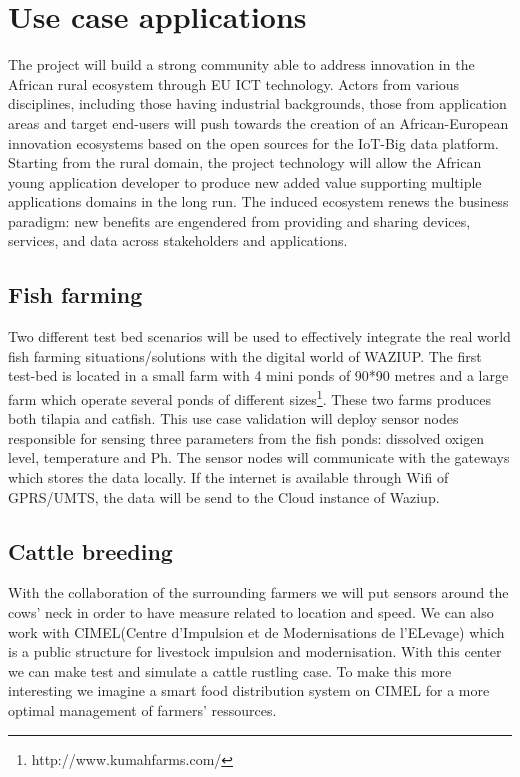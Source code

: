 
\section{Use case applications}
\label{sec:usecases}

The project will build a strong community able to address innovation in the African rural ecosystem through EU ICT technology.
Actors from various disciplines, including those having industrial backgrounds, those from application areas and target end-users will push towards the creation of an African-European innovation ecosystems based on the open sources for the IoT-Big data platform.
Starting from the rural domain, the project technology will allow the
African young application developer to produce new added value supporting multiple applications domains in the long run.
The induced ecosystem renews the business paradigm: new benefits are engendered from providing and sharing devices, services, and data across stakeholders and applications.

\subsection{Fish farming}

Two different test bed scenarios will be used to effectively integrate the real world fish farming situations/solutions with the digital world of WAZIUP.
The first test-bed is located in a small farm with 4 mini ponds of 90*90 metres and a large farm which operate several ponds of different sizes\footnote{http://www.kumahfarms.com/}.
These two farms produces both tilapia and catfish.
This use case validation will deploy sensor nodes responsible for sensing three parameters from the fish ponds: dissolved oxigen level, temperature and Ph.
The sensor nodes will communicate with the gateways which stores the data locally.
If the internet is available through Wifi of GPRS/UMTS, the data will be send to the Cloud instance of Waziup.

\subsection{Cattle breeding}

With the collaboration of the surrounding farmers we will put sensors around the cows’ neck in order to have measure related to location and speed.
We can also work with CIMEL(Centre d’Impulsion et de Modernisations de l’ELevage) which is a public structure for livestock impulsion and modernisation.
With this center we can make test and simulate a cattle rustling case.
To make this more interesting we imagine a smart food distribution system on CIMEL for a more optimal management of farmers’ ressources.


